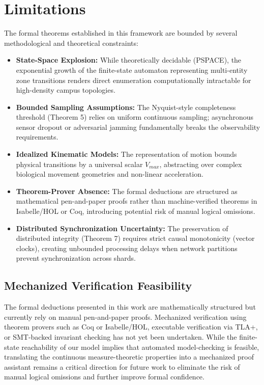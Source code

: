 \documentclass[conference]{IEEEtran}
\begin{document}
\section{Limitations}
The formal theorems established in this framework are bounded by several methodological and theoretical constraints:
\begin{itemize}
    \item \textbf{State-Space Explosion:} While theoretically decidable (PSPACE), the exponential growth of the finite-state automaton representing multi-entity zone transitions renders direct enumeration computationally intractable for high-density campus topologies.
    \item \textbf{Bounded Sampling Assumptions:} The Nyquist-style completeness threshold (Theorem 5) relies on uniform continuous sampling; asynchronous sensor dropout or adversarial jamming fundamentally breaks the observability requirements.
    \item \textbf{Idealized Kinematic Models:} The representation of motion bounds physical transitions by a universal scalar $V_{max}$, abstracting over complex biological movement geometries and non-linear acceleration.
    \item \textbf{Theorem-Prover Absence:} The formal deductions are structured as mathematical pen-and-paper proofs rather than machine-verified theorems in Isabelle/HOL or Coq, introducing potential risk of manual logical omissions.
    \item \textbf{Distributed Synchronization Uncertainty:} The preservation of distributed integrity (Theorem 7) requires strict causal monotonicity (vector clocks), creating unbounded processing delays when network partitions prevent synchronization across shards.
\end{itemize}

\subsection{Mechanized Verification Feasibility}
The formal deductions presented in this work are mathematically structured but currently rely on manual pen-and-paper proofs. Mechanized verification using theorem provers such as Coq or Isabelle/HOL, executable verification via TLA+, or SMT-backed invariant checking has not yet been undertaken. While the finite-state reachability of our model implies that automated model-checking is feasible, translating the continuous measure-theoretic properties into a mechanized proof assistant remains a critical direction for future work to eliminate the risk of manual logical omissions and further improve formal confidence.
\end{document}
